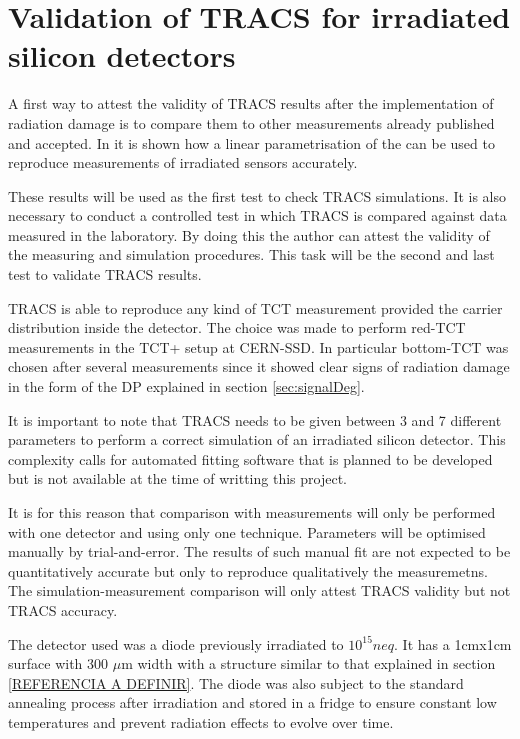 \chapter{Validation of TRACS for irradiated silicon detectors}
\label{sec:TRACSvalidity}

A first way to attest the validity of TRACS results after the implementation of radiation damage is to compare them to other measurements already published and accepted. In \cite{Pholsen} it is shown how a linear parametrisation of the \neff can be used to reproduce measurements of irradiated sensors accurately.

These results will be used as the first test to check TRACS simulations. It is also necessary to conduct a controlled test in which TRACS is compared against data measured in the laboratory. By doing this the author can attest the validity of the measuring and simulation procedures. This task will be the second and last test to validate TRACS results.

TRACS is able to reproduce any kind of TCT measurement provided the carrier distribution inside the detector. The choice was made to perform red-TCT measurements in the TCT+ setup at CERN-SSD\cite{ssd}. In particular bottom-TCT was chosen after several measurements since it showed clear signs of radiation damage in the form of the DP explained in section \ref{sec:signalDeg}. 

It is important to note that TRACS needs to be given between 3 and 7 different parameters to perform a correct simulation of an irradiated silicon detector. This complexity calls for automated fitting software that is planned to be developed but is not available at the time of writting this project.

It is for this reason that comparison with measurements will only be performed with one detector and using only one technique. Parameters will be optimised manually by trial-and-error. The results of such manual fit are not expected to be quantitatively accurate but only to reproduce qualitatively the measuremetns. The simulation-measurement comparison will only attest TRACS validity but not TRACS accuracy.

The detector used was a diode previously irradiated to $10^{15} neq$. It has a  1cmx1cm surface with 300 $\mu$m width with a structure similar to that explained in section \ref{REFERENCIA A DEFINIR}. The diode was also subject to the standard annealing process after irradiation and stored in a fridge to ensure constant low temperatures and prevent radiation effects to evolve over time. 


